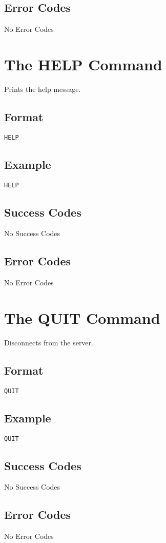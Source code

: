 \subsection{Error Codes}
No Error Codes
\clearpage

\section{The HELP Command}
Prints the help message.
\subsection{Format}
\begin{lstlisting}
HELP
\end{lstlisting}
\subsection{Example}
\begin{lstlisting}
HELP
\end{lstlisting}
\subsection{Success Codes}
No Success Codes
\subsection{Error Codes}
No Error Codes
\clearpage

\section{The QUIT Command}
Disconnects from the server.
\subsection{Format}
\begin{lstlisting}
QUIT
\end{lstlisting}
\subsection{Example}
\begin{lstlisting}
QUIT
\end{lstlisting}
\subsection{Success Codes}
No Success Codes
\subsection{Error Codes}
No Error Codes
\clearpage

